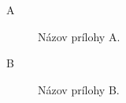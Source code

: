 
\chapter*{\appendixlistname}

\begin{description}
	\item[\appendixname{} A] Názov prílohy A.
    \item[\appendixname{} B] Názov prílohy B.
\end{description}
